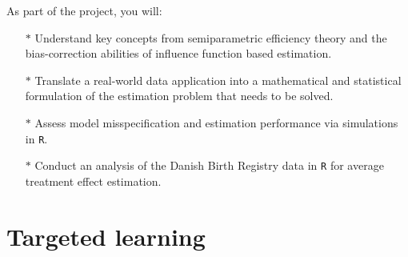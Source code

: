 \documentclass{article}
\newcommand{\1}{\mathbb{1}}
\begin{document}
As part of the project, you will:
\begin{itemize}
\item[\(*\)] Understand key concepts from semiparametric efficiency
  theory and the bias-correction abilities of influence function based
  estimation.
\item[\(*\)] Translate a real-world data application into a
  mathematical and statistical formulation of the estimation problem
  that needs to be solved. 
\item[\(*\)] Assess model misspecification and estimation performance
  via simulations in \verb+R+.
\item[\(*\)] Conduct an analysis of the Danish Birth Registry data in
  \verb+R+ for average treatment effect estimation.
\end{itemize}






\section{Targeted learning}
\end{document}
